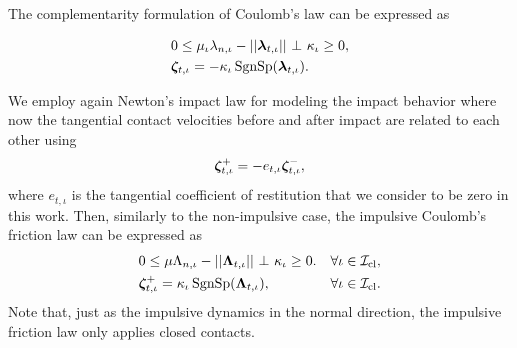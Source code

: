 \documentclass[../DC2017114Bouma.tex]{subfiles}
\begin{document}
The complementarity formulation of Coulomb's law can be expressed as

\begin{align}
&0\leq \mu_{\iota}\lambda_{n,\iota} - ||\lambdab_{t,\iota}||\ \bot\ \kappa_{\iota} \geq 0,\label{eq:coulomb1}\\
&\zetab_{t,\iota} = -\kappa_{\iota}\SgnSp(\lambdab_{t,\iota}).\label{eq:coulomb2}
\end{align}

We employ again Newton's impact law for modeling the impact behavior where now the tangential contact velocities before and after impact are related to each other using
\begin{align}
\boldsymbol{\zeta}^+_{t,\iota} = -e_{t,\iota}\boldsymbol{\zeta}^-_{t,\iota},
\end{align}
where $e_{t,\iota}$ is the tangential coefficient of restitution that we consider to be zero in this work. Then, similarly to the non-impulsive case, the impulsive Coulomb's friction law can be expressed as
\begin{align}
&0 \leq \mu\Lambda_{n,\iota} - ||\Lambdab_{t,\iota}||\ \bot\ \kappa_{\iota} \geq 0. &\forall \iota\in\Ic_{\text{cl}},\label{eq:coulombimp1}\\
&\zetab_{t,\iota}^+ = \kappa_{\iota}\SgnSp(\Lambdab_{t,\iota}),  &\forall \iota\in\Ic_{\text{cl}}.\label{eq:coulombimp2}
\end{align}
Note that, just as the impulsive dynamics in the normal direction, the impulsive friction law only applies closed contacts.
\end{document}

